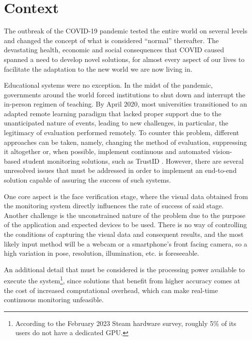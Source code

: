\documentclass[class=report, crop=false, a4paper, 12pt]{standalone}
\begin{document}
\section{Context}
The outbreak of the COVID-19 pandemic tested the entire world on several levels and changed the concept of what is considered ``normal'' thereafter. The devastating health, economic and social consequences that COVID caused spanned a need to develop novel solutions, for almost every aspect of our lives to facilitate the adaptation to the new world we are now living in. 

\par Educational systems were no exception. In the midst of the pandemic, governments around the world forced institutions to shut down and interrupt the in-person regimen of teaching. By April 2020, most universities transitioned to an adapted remote learning paradigm \autocite{winsteadRemoteMicroelectronicsLaboratory2022} that lacked proper support due to the unanticipated nature of events, leading to new challenges, in particular, the legitimacy of evaluation performed remotely. To counter this problem, different approaches can be taken, namely, changing the method of evaluation, suppressing it altogether \autocite{barronrodriguezRemoteLearningGlobal2021} or, when possible, implement continuous and automated vision-based student monitoring solutions, such as TrustID \autocite{fariaImagebasedFaceVerification2023}. However, there are several unresolved issues that must be addressed in order to implement an end-to-end solution capable of assuring the success of such systems. 

\par One core aspect is the face verification stage, where the visual data obtained from the monitoring system directly influences the rate of success of said stage. Another challenge is the unconstrained nature of the problem due to the purpose of the application and expected devices to be used. There is no way of controlling the conditions of capturing the visual data and consequent results, and the most likely input method will be a webcam or a smartphone's front facing camera, so a high variation in pose, resolution, illumination, etc. is foreseeable. 

\par An additional detail that must be considered is the processing power available to execute the system\footnote{According to the February 2023 Steam hardware survey, roughly 5\% of its users do not have a dedicated GPU.}, since solutions that benefit from higher accuracy comes at the cost of increased computational overhead, which can make real-time continuous monitoring unfeasible.
\end{document}
